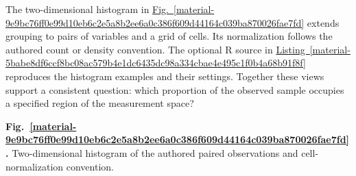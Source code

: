 \documentclass[11pt,a4paper]{article}
\begin{document}
\medskip

The two-dimensional histogram in \hyperref[material-9e9bc76ff0e99d10eb6c2e5a8b2ee6a0c386f609d44164c039ba870026fae7fd]{Fig.~\ref*{material-9e9bc76ff0e99d10eb6c2e5a8b2ee6a0c386f609d44164c039ba870026fae7fd}} extends grouping to pairs of variables and a grid of cells. Its normalization follows the authored count or density convention. The optional R source in \hyperref[material-5babe8df6ccf8bc08ac579b4e1dc6435dc98a334cbae4e495c1f0b4a68b91f8f]{Listing~\ref*{material-5babe8df6ccf8bc08ac579b4e1dc6435dc98a334cbae4e495c1f0b4a68b91f8f}} reproduces the histogram examples and their settings. Together these views support a consistent question: which proportion of the observed sample occupies a specified region of the measurement space?


\par\medskip
\Needspace{10cm}
\label{material-9e9bc76ff0e99d10eb6c2e5a8b2ee6a0c386f609d44164c039ba870026fae7fd}
\noindent\textbf{Fig.~\ref*{material-9e9bc76ff0e99d10eb6c2e5a8b2ee6a0c386f609d44164c039ba870026fae7fd}.} Two-dimensional histogram of the authored paired observations and cell-normalization convention.\par\nopagebreak
\end{document}
